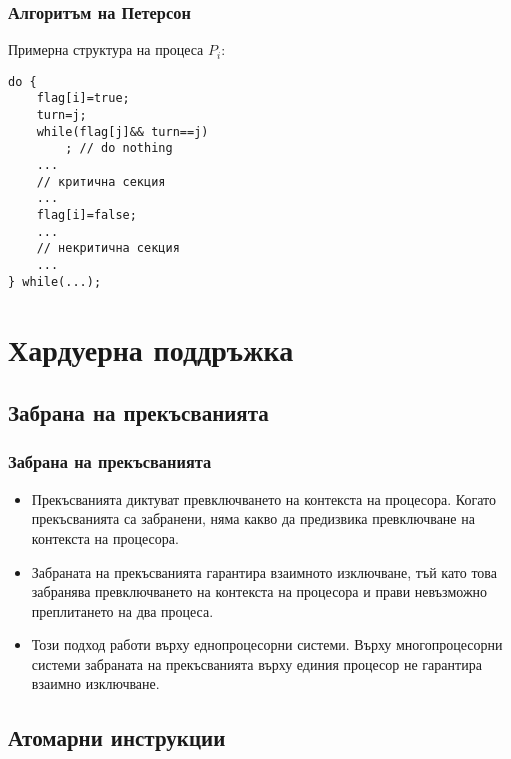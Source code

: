 \documentclass[ignorenonframetext, hyperref=unicode]{beamer}
\begin{document}
\begin{frame}[containsverbatim]
\frametitle{Алгоритъм на Петерсон}
Примерна структура на процеса $P_i$:
\begin{lstlisting}
do {
	flag[i]=true;
	turn=j;
	while(flag[j]&& turn==j)
		; // do nothing
	...
	// критична секция
	...
	flag[i]=false;
	...
	// некритична секция
	...
} while(...);
\end{lstlisting}
\end{frame}


\section{Хардуерна поддръжка}

\subsection{Забрана на прекъсванията}

\begin{frame}[containsverbatim]
\frametitle{Забрана на прекъсванията}
\begin{itemize}
\item Прекъсванията диктуват превключването на контекста на процесора. Когато
прекъсванията са забранени, няма какво да предизвика превключване на контекста
на процесора. 
\item Забраната на прекъсванията гарантира взаимното изключване, тъй като това
забранява превключването на контекста на процесора и прави невъзможно
преплитането на два процеса.
\item Този подход работи върху еднопроцесорни системи. Върху многопроцесорни
системи забраната на прекъсванията върху единия процесор не гарантира взаимно
изключване. 
\end{itemize}
\end{frame}

\subsection{Атомарни инструкции}
\end{document}
